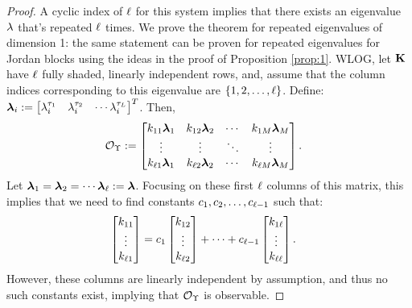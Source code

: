 \begin{proof}
	A cyclic index of $\ell$ for this system implies that there exists an eigenvalue $\lambda$ that's repeated $\ell$ times. We prove the theorem for repeated eigenvalues of dimension 1: the same statement can be proven for repeated eigenvalues for Jordan blocks using the ideas in the proof of Proposition \ref{prop:1}. 
	WLOG, let $\mathbf{K}$ have $\ell$ fully shaded, linearly independent rows, and, assume that the column indices corresponding to this eigenvalue are $\{1,2,\dots,\ell\}$. Define: 
	$\boldsymbol{\lambda}_i:= \begin{bmatrix}\lambda_i^{\tau_1} & \lambda_i^{\tau_2} & \cdots \lambda_i^{\tau_{L}}\end{bmatrix}^T$. Then,
	\begin{align*}
	\mathcal{O}_{\Upsilon}
	&:= 
	\begin{bmatrix}
	k_{11} \boldsymbol{\lambda}_1 & k_{12} \boldsymbol{\lambda}_2 & \cdots & k_{1M} \boldsymbol{\lambda}_{M}\\
	\vdots & \vdots & \ddots & \vdots\\
	k_{\ell 1} \boldsymbol{\lambda}_1 & k_{\ell 2} \boldsymbol{\lambda}_2 & \cdots & k_{\ell M} \boldsymbol{\lambda}_{M}
	\end{bmatrix}.
	\end{align*}
	Let $\boldsymbol{\lambda}_1 = \boldsymbol{\lambda}_2 = \cdots \boldsymbol{\lambda}_{\ell} := \boldsymbol{\lambda}$. 
	Focusing on these first $\ell$ columns of this matrix, this implies that
	we need to find constants $c_1,c_2,\dots, c_{\ell-1}$ such that:
	\begin{align*}
	\begin{bmatrix}
	k_{11}\\
	\vdots\\
	k_{\ell 1}
	\end{bmatrix}
	&= 
	c_1 
	\begin{bmatrix}
	k_{12}\\
	\vdots\\
	k_{\ell 2}
	\end{bmatrix}
	+ \cdots + 
	c_{\ell-1} 
	\begin{bmatrix}
	k_{1\ell}\\   
	\vdots\\
	k_{\ell \ell} 
	\end{bmatrix}.
	\end{align*}
	However, these columns are linearly independent by assumption, and thus no such constants exist, implying that $\mathcal{O}_{\Upsilon}$ is observable. 
\end{proof}

